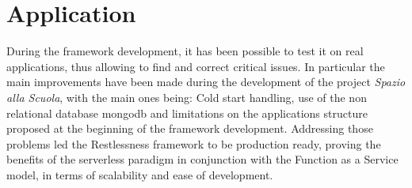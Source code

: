 \documentclass{article}
\begin{document}
\section{Application}
During the framework development, it has been possible to test it on real applications,
thus allowing to find and correct critical issues. In particular the main improvements
have been made during the development of the project \textit{Spazio alla Scuola},
with the main ones being: Cold start handling, use of the non relational database
mongodb and limitations on the applications structure proposed at the beginning
of the framework development. Addressing those problems led the Restlessness
framework to be production ready, proving the benefits of the serverless paradigm
in conjunction with the Function as a Service model, in terms of scalability and
ease of development.
\end{document}
